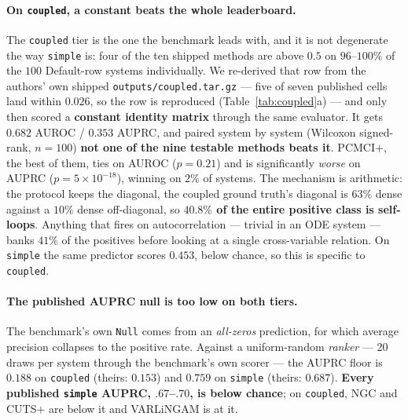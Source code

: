 \documentclass[10pt,twocolumn]{article}
\begin{document}
\paragraph{On \texttt{coupled}, a constant beats the whole leaderboard.} The
\texttt{coupled} tier is the one the benchmark leads with, and it is not degenerate the
way \texttt{simple} is: four of the ten shipped methods are above $0.5$ on $96$--$100\%$
of the $100$ Default-row systems individually. We re-derived that row from the authors'
own shipped \texttt{outputs/coupled.tar.gz} --- five of seven published cells land
within $0.026$, so the row is reproduced (Table~\ref{tab:coupled}a) --- and only then
scored a \textbf{constant identity matrix} through the same evaluator. It gets
$0.682$ AUROC / $0.353$ AUPRC, and paired system by system (Wilcoxon signed-rank,
$n{=}100$) \textbf{not one of the nine testable methods beats it}. PCMCI$+$, the best
of them, ties on AUROC ($p{=}0.21$) and is significantly \emph{worse} on AUPRC
($p{=}5\times10^{-18}$), winning on $2\%$ of systems. The mechanism is arithmetic: the
protocol keeps the diagonal, the coupled ground truth's diagonal is $63\%$ dense against
a $10\%$ dense off-diagonal, so \textbf{$40.8\%$ of the entire positive class is
self-loops}. Anything that fires on autocorrelation --- trivial in an ODE system ---
banks $41\%$ of the positives before looking at a single cross-variable relation. On
\texttt{simple} the same predictor scores $0.453$, below chance, so this is specific to
\texttt{coupled}.



\paragraph{The published AUPRC null is too low on both tiers.} The benchmark's own
\texttt{Null} comes from an \emph{all-zeros} prediction, for which average precision
collapses to the positive rate. Against a uniform-random \emph{ranker} --- 20 draws per
system through the benchmark's own scorer --- the AUPRC floor is $0.188$ on
\texttt{coupled} (theirs: $0.153$) and $0.759$ on \texttt{simple} (theirs: $0.687$).
\textbf{Every published \texttt{simple} AUPRC, $.67$--$.70$, is below chance}; on
\texttt{coupled}, NGC and CUTS$+$ are below it and VARLiNGAM is at it.
\end{document}
